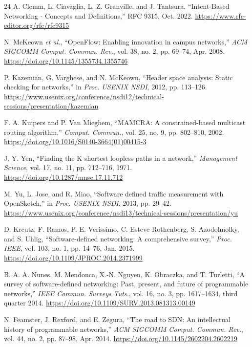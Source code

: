 \documentclass[conference]{IEEEtran}
\begin{document}
\balance
\begin{thebibliography}{24}
 A. Clemm, L. Ciavaglia, L. Z. Granville, and J. Tantsura,
``Intent-Based Networking - Concepts and Definitions,'' RFC 9315, Oct. 2022.
\url{https://www.rfc-editor.org/rfc/rfc9315}

 N. McKeown \emph{et al.}, ``OpenFlow:
Enabling innovation in campus networks,'' \emph{ACM SIGCOMM Comput. Commun.
Rev.}, vol. 38, no. 2, pp. 69--74, Apr. 2008.
\url{https://doi.org/10.1145/1355734.1355746}

 P. Kazemian, G. Varghese, and N. McKeown,
``Header space analysis: Static checking for networks,'' in
\emph{Proc. USENIX NSDI}, 2012, pp. 113--126.
\url{https://www.usenix.org/conference/nsdi12/technical-sessions/presentation/kazemian}

 F. A. Kuipers and P. Van Mieghem,
``MAMCRA: A constrained-based multicast routing algorithm,''
\emph{Comput. Commun.}, vol. 25, no. 9, pp. 802--810, 2002.
\url{https://doi.org/10.1016/S0140-3664(01)00415-3}

 J. Y. Yen, ``Finding the K shortest loopless paths in a
network,'' \emph{Management Science}, vol. 17, no. 11, pp. 712--716, 1971.
\url{https://doi.org/10.1287/mnsc.17.11.712}

 M. Yu, L. Jose, and R. Miao,
``Software defined traffic measurement with OpenSketch,'' in
\emph{Proc. USENIX NSDI}, 2013, pp. 29--42.
\url{https://www.usenix.org/conference/nsdi13/technical-sessions/presentation/yu}

 D. Kreutz, F. Ramos, P. E. Verissimo, C. Esteve
Rothenberg, S. Azodolmolky, and S. Uhlig, ``Software-defined networking:
A comprehensive survey,'' \emph{Proc. IEEE}, vol. 103, no. 1,
pp. 14--76, Jan. 2015. \url{https://doi.org/10.1109/JPROC.2014.2371999}

 B. A. A. Nunes, M. Mendonca, X.-N. Nguyen,
K. Obraczka, and T. Turletti, ``A survey of software-defined networking:
Past, present, and future of programmable networks,'' \emph{IEEE Commun.
Surveys Tuts.}, vol. 16, no. 3, pp. 1617--1634, third quarter 2014.
\url{https://doi.org/10.1109/SURV.2013.081313.00149}

 N. Feamster, J. Rexford, and E. Zegura, ``The road
to SDN: An intellectual history of programmable networks,'' \emph{ACM
SIGCOMM Comput. Commun. Rev.}, vol. 44, no. 2, pp. 87--98, Apr. 2014.
\url{https://doi.org/10.1145/2602204.2602219}


\end{thebibliography}
\end{document}

